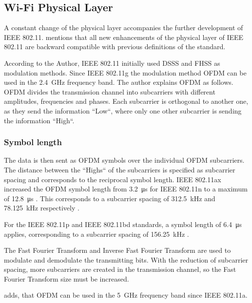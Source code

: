 \subsection*{Wi-Fi Physical Layer}
A constant change of the physical layer accompanies the further development of IEEE 802.11.
\textcite{sauter_wireless_2022} mentions that all new enhancements of the physical layer of IEEE 802.11 are backward
compatible with previous definitions of the standard.

According to the Author, IEEE 802.11 initially used DSSS and FHSS as modulation methods.
Since IEEE 802.11g the modulation method \ac{OFDM} can be used in the \SI{2.4}{\giga\hertz} frequency band.
The author explains \ac{OFDM} as follows. \ac{OFDM} divides the transmission channel into subcarriers with different
amplitudes, frequencies and phases.
Each subcarrier is orthogonal to another one, as they send the information ``Low``,
where only one other subcarrier is sending the information ``High``.


\subsubsection*{Symbol length}
The data is then sent as \ac{OFDM} symbols over the individual \ac{OFDM} subcarriers.
The distance between the ``Highs`` of the subcarriers is specified as subcarrier spacing and corresponds to the reciprocal
symbol length.
IEEE 802.11ax increased the \ac{OFDM} symbol length from \SI{3.2}{\micro\second} for IEEE 802.11n  to a maximum of \SI{12.8}{\micro\second} \cite{sauter_wireless_2022}.
This corresponds to a subcarrier spacing of \SI{312.5}{\kilo\hertz} and \SI{78.125}{\kilo\hertz} respectively \cite{sauter_wireless_2022}.

For the IEEE 802.11p and IEEE 802.11bd standards, a symbol length of \SI{6.4}{\micro\second} applies, corresponding to a subcarrier spacing of \SI{156.25}{\kilo\hertz} \cite{jacob_system-level_2020}.

The Fast Fourier Transform and Inverse Fast Fourier Transform are used to modulate and demodulate the transmitting bits.
With the reduction of subcarrier spacing, more subcarriers are created in the transmission channel,
so the Fast Fourier Transform size must be increased.

\textcite{kauffels_wireless_2002} adds, that \ac{OFDM} can be used in the \SI{5}{\giga\hertz} frequency band since IEEE 802.11a.
